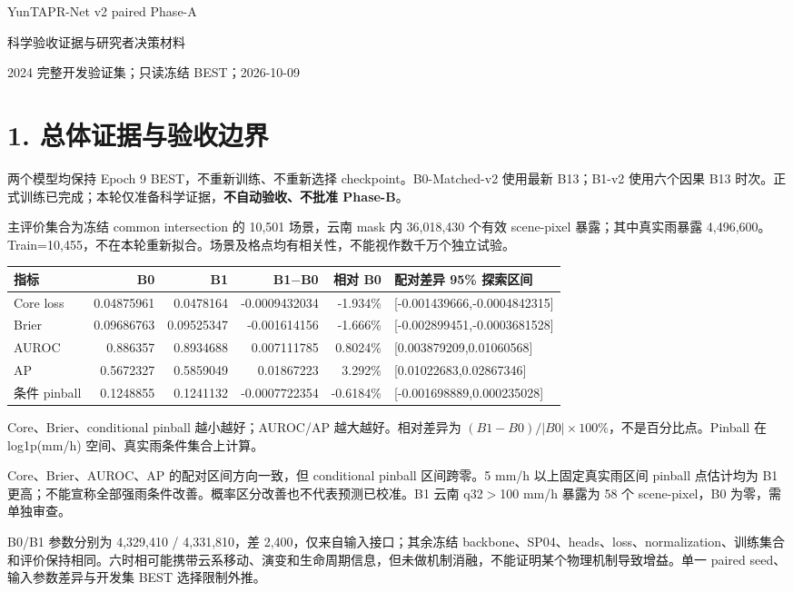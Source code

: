 \documentclass[UTF8,a4paper,10pt,fontset=windows]{ctexart}
\begin{document}
\begin{center}{\LARGE YunTAPR-Net v2 paired Phase-A}\par{\Large 科学验收证据与研究者决策材料}\par 2024 完整开发验证集；只读冻结 BEST；2026-10-09\end{center}
\section*{1. 总体证据与验收边界}
两个模型均保持 Epoch 9 BEST，不重新训练、不重新选择 checkpoint。B0-Matched-v2 使用最新 B13；B1-v2 使用六个因果 B13 时次。正式训练已完成；本轮仅准备科学证据，\textbf{不自动验收、不批准 Phase-B}。

主评价集合为冻结 common intersection 的 10,501 场景，云南 mask 内 36,018,430 个有效 scene-pixel 暴露；其中真实雨暴露 4,496,600。Train=10,455，不在本轮重新拟合。场景及格点均有相关性，不能视作数千万个独立试验。

\begin{center}\scriptsize\begin{tabular}{lrrrrl}\toprule
指标 & B0 & B1 & B1$-$B0 & 相对 B0 & 配对差异 95\% 探索区间\\\midrule
Core loss & 0.04875961 & 0.0478164 & -0.0009432034 & -1.934\% & [-0.001439666,-0.0004842315]\\
Brier & 0.09686763 & 0.09525347 & -0.001614156 & -1.666\% & [-0.002899451,-0.0003681528]\\
AUROC & 0.886357 & 0.8934688 & 0.007111785 & 0.8024\% & [0.003879209,0.01060568]\\
AP & 0.5672327 & 0.5859049 & 0.01867223 & 3.292\% & [0.01022683,0.02867346]\\
条件 pinball & 0.1248855 & 0.1241132 & -0.0007722354 & -0.6184\% & [-0.001698889,0.000235028]\\
\bottomrule\end{tabular}\end{center}
Core、Brier、conditional pinball 越小越好；AUROC/AP 越大越好。相对差异为 $(B1-B0)/|B0|\times100\%$，不是百分比点。Pinball 在 log1p(mm/h) 空间、真实雨条件集合上计算。

Core、Brier、AUROC、AP 的配对区间方向一致，但 conditional pinball 区间跨零。5 mm/h 以上固定真实雨区间 pinball 点估计均为 B1 更高；不能宣称全部强雨条件改善。概率区分改善也不代表预测已校准。B1 云南 q32$>$100 mm/h 暴露为 58 个 scene-pixel，B0 为零，需单独审查。

B0/B1 参数分别为 4,329,410 / 4,331,810，差 2,400，仅来自输入接口；其余冻结 backbone、SP04、heads、loss、normalization、训练集合和评价保持相同。六时相可能携带云系移动、演变和生命周期信息，但未做机制消融，不能证明某个物理机制导致增益。单一 paired seed、输入参数差异与开发集 BEST 选择限制外推。
\end{document}
